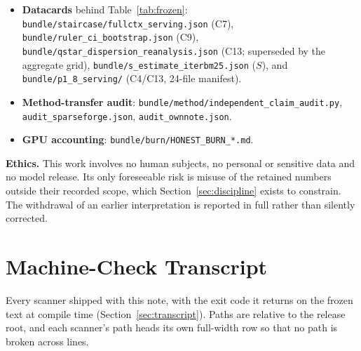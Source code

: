 \documentclass{article}
\newcommand{\zb}{\discretionary{}{}{}}
\newcommand{\code}[1]{\texttt{#1}}
\begin{document}
{\begin{itemize}
        \code{bundle/oom/\zb fullctx\_32k\_oom.log} (abort) --- records of the pre-fix surface,
        never capacity bounds.
  \item \textbf{Datacards} behind Table~\ref{tab:frozen}:
        \code{bundle/staircase/\zb fullctx\_serving.json} (C7),
        \code{bundle/\zb ruler\_ci\_bootstrap.json} (C9),
        \code{bundle/qstar\_dispersion\_reanalysis.json} (C13; superseded by the aggregate grid),
        \code{bundle/\zb s\_estimate\_iterbm25.json} ($S$), and
        \code{bundle/p1\_8\_serving/} (C4/C13, 24-file manifest).
  \item \textbf{Method-transfer audit}: \code{bundle/method/\zb independent\_claim\_audit.py},
        \code{audit\_sparseforge.json}, \code{audit\_ownnote.json}.
  \item \textbf{GPU accounting}: \code{bundle/burn/HONEST\_BURN\_*.md}.
\end{itemize}
\textbf{Ethics.} This work involves no human subjects, no personal or sensitive data and no
model release. Its only foreseeable risk is misuse of the retained numbers outside their
recorded scope, which Section~\ref{sec:discipline} exists to constrain. The withdrawal of an
earlier interpretation is reported in full rather than silently corrected.
}

\section{Machine-Check Transcript}\label{app:transcript}
Every scanner shipped with this note, with the exit code it returns on the frozen text at compile
time (Section~\ref{sec:transcript}). Paths are relative to the release root, and each scanner's
path heads its own full-width row so that no path is broken across lines.
\end{document}
